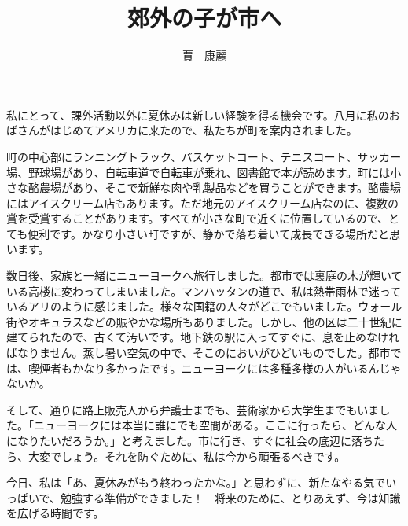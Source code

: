 \documentclass[
  paper=a4,
  tate,
  fontsize=12pt
]{jlreq}
\title{郊外の子が市へ}
\author{賈　康麗}
\date{}
\begin{document}
\maketitle

私にとって、課外活動以外に夏休みは新しい経験を得る機会です。八月に私のおばさんがはじめてアメリカに来たので、私たちが町を案内されました。

町の中心部にランニングトラック、バスケットコート、テニスコート、サッカー場、野球場があり、自転車道で自転車が乗れ、図書館で本が読めます。町には小さな酪農場があり、そこで新鮮な肉や乳製品などを買うことができます。酪農場にはアイスクリーム店もあります。ただ地元のアイスクリーム店なのに、複数の賞を受賞することがあります。すべてが小さな町で近くに位置しているので、とても便利です。かなり小さい町ですが、静かで落ち着いて成長できる場所だと思います。

数日後、家族と一緒にニューヨークへ旅行しました。都市では裏庭の木が輝いている高楼に変わってしまいました。マンハッタンの道で、私は熱帯雨林で迷っているアリのように感じました。様々な国籍の人々がどこでもいました。ウォール街やオキュラスなどの賑やかな場所もありました。しかし、他の区は二十世紀に建てられたので、古くて汚いです。地下鉄の駅に入ってすぐに、息を止めなければなりません。蒸し暑い空気の中で、そこのにおいがひどいものでした。都市では、喫煙者もかなり多かったです。ニューヨークには多種多様の人がいるんじゃないか。

そして、通りに路上販売人から弁護士までも、芸術家から大学生までもいました。「ニューヨークには本当に誰にでも空間がある。ここに行ったら、どんな人になりたいだろうか。」と考えました。市に行き、すぐに社会の底辺に落ちたら、大変でしょう。それを防ぐために、私は今から頑張るべきです。

今日、私は「あ、夏休みがもう終わったかな。」と思わずに、新たなやる気でいっぱいで、勉強する準備ができました！　将来のために、とりあえず、今は知識を広げる時間です。
\end{document}
